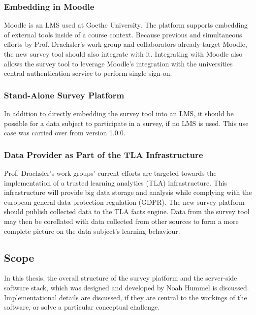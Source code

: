 \documentclass[a4paper,11pt]{article}
\begin{document}
            \subsubsection{Embedding in Moodle}
            Moodle is an LMS used at Goethe University. The platform supports embedding of external
            tools inside of a course context. Because previous and simultaneous efforts by Prof. Drachsler's
            work group and collaborators already target Moodle, the new survey tool should also integrate
            with it. Integrating with Moodle also allows the survey tool to leverage
            Moodle's integration with the universities central authentication service
            to perform single sign-on.
           
            \subsubsection{Stand-Alone Survey Platform}
            In addition to directly embedding the survey tool into an LMS, it should be possible
            for a data subject to participate in a survey, if no LMS is used.
            This use case was carried over from version 1.0.0.

            \subsubsection{Data Provider as Part of the TLA Infrastructure}
            Prof. Drachsler's work groups' current efforts are targeted towards the implementation
            of a trusted learning analytics (TLA) infrastructure. This infrastructure will
            provide big data storage and analysis while complying with the european general
            data protection regulation (GDPR). The new survey platform should publish collected data
            to the TLA facts engine. Data from the survey tool may then be corellated
            with data collected from other sources to form a more complete picture
            on the data subject's learning behaviour.

        \subsection{Scope}

            In this thesis, the overall structure of the survey platform and the server-side
            software stack, which was designed and developed by Noah Hummel is discussed.
            Implementational details are discussed, if they are central to the workings
            of the software, or solve a particular conceptual challenge.
\end{document}
